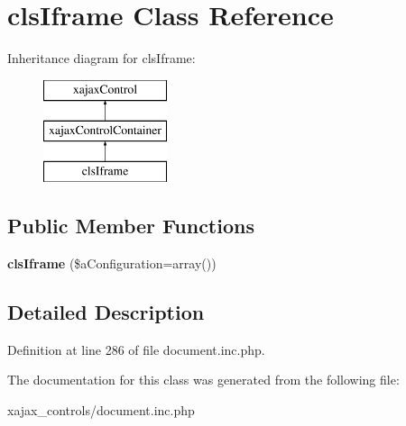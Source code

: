 \hypertarget{classclsIframe}{
\section{clsIframe Class Reference}
\label{classclsIframe}
}
Inheritance diagram for clsIframe:\begin{figure}[H]
\begin{center}
\leavevmode
\includegraphics[height=3.000000cm]{classclsIframe}
\end{center}
\end{figure}
\subsection*{Public Member Functions}
\begin{DoxyCompactItemize}
\item 
\hypertarget{classclsIframe_a69c18cef43ce251dd8f96f80d44a96b5}{
{\bfseries clsIframe} (\$aConfiguration=array())}
\label{classclsIframe_a69c18cef43ce251dd8f96f80d44a96b5}

\end{DoxyCompactItemize}


\subsection{Detailed Description}


Definition at line 286 of file document.inc.php.



The documentation for this class was generated from the following file:\begin{DoxyCompactItemize}
\item 
xajax\_\-controls/document.inc.php\end{DoxyCompactItemize}
